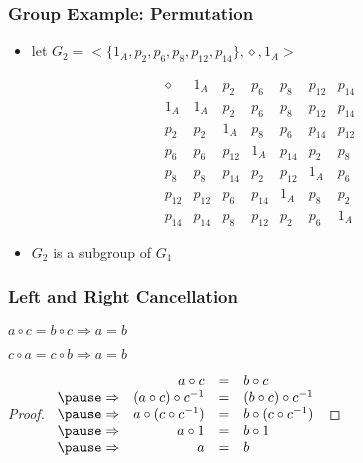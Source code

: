 \documentclass[dvipsnames]{beamer}
\begin{document}
\begin{frame}
  \frametitle{Group Example: Permutation}

  \begin{example}
    \begin{itemize}
      \item let $G_2=<\{1_A,p_2,p_6,p_8,p_{12},p_{14}\},\diamond,1_A>$
    \end{itemize}

    \[
      \begin{array}{c||c|c|c|c|c|c}
        \diamond & 1_{A}  & p_{2}  & p_{6}  & p_{8}  & p_{12} & p_{14}\\\hline\hline
        1_{A}    & 1_{A}  & p_{2}  & p_{6}  & p_{8}  & p_{12} & p_{14}\\\hline
        p_{2}    & p_{2}  & 1_{A}  & p_{8}  & p_{6}  & p_{14} & p_{12}\\\hline
        p_{6}    & p_{6}  & p_{12} & 1_{A}  & p_{14} & p_{2}  & p_{8}\\\hline
        p_{8}    & p_{8}  & p_{14} & p_{2}  & p_{12} & 1_{A}  & p_{6}\\\hline
        p_{12}   & p_{12} & p_{6}  & p_{14} & 1_{A}  & p_{8}  & p_{2}\\\hline
        p_{14}   & p_{14} & p_{8}  & p_{12} & p_{2}  & p_{6}  & 1_{A}
      \end{array}
    \]

    \pause
    \bigskip
    \begin{itemize}
      \item $G_2$ is a subgroup of $G_1$
    \end{itemize}
  \end{example}
\end{frame}

\begin{frame}
  \frametitle{Left and Right Cancellation}

  \begin{theorem}
    $a \circ c = b \circ c \Rightarrow a = b$

    $c \circ a = c \circ b \Rightarrow a = b$
  \end{theorem}

  \pause
  \begin{proof}
    $\begin{array}{crcl}
                  & a \circ c                & = & b \circ c\\ \pause
      \Rightarrow & (a \circ c) \circ c^{-1} & = & (b \circ c) \circ c^{-1}\\ \pause
      \Rightarrow & a \circ (c \circ c^{-1}) & = & b \circ (c \circ c^{-1})\\ \pause
      \Rightarrow & a \circ 1                & = & b \circ 1\\ \pause
      \Rightarrow & a                        & = & b
    \end{array}$

  \end{proof}
\end{frame}
\end{document}
